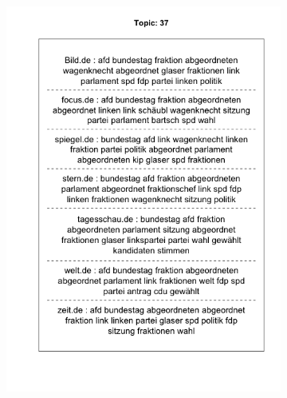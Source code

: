 \documentclass[12pt,a4paper,notitlepage]{article}
\begin{document}
\begin{figure}[H]
	\begin{center}
		\begin{subfigure}[normla]{0.49\textwidth}
			\includegraphics[width=\textwidth]{figs/plotquote37.png}
		\end{subfigure}
		\begin{subfigure}[normla]{0.49\textwidth}

\end{subfigure}
\end{center}
\end{figure}
\end{document}
